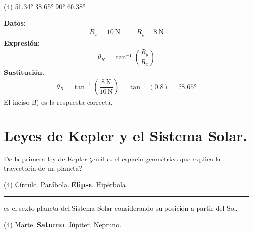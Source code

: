 \documentclass[12pt, letter]{exam}
\begin{document}
\begin{questions}
    \begin{tasks}(4)
        \task \ang{51.34}
        \task \ang{38.65}
        \task \ang{90}
        \task \ang{60.38}
    \end{tasks}
    \textbf{Datos:}
    \begin{align*}
    R_{x} = \SI{10}{\newton} \hspace{1cm} R_{y} = \SI{8}{\newton}
    \end{align*}
    \textbf{Expresión:}
    \begin{align*}
    \theta_{R} = \tan^{-1} \left( \dfrac{R_{y}}{R_{x}} \right)
    \end{align*}
    \textbf{Sustitución:}
    \begin{align*}
        \theta_{R} = \tan^{-1} \left( \dfrac{\SI{8}{\newton}}{\SI{10}{\newton}} \right) = \tan^{-1} (0.8) = \ang{38.65}
    \end{align*}
    El inciso B) es la respuesta correcta.

    \section{Leyes de Kepler y el Sistema Solar.}
    \question De la primera ley de Kepler ¿cuál es el espacio geométrico que explica la trayectoria de un planeta?
    \begin{tasks}(4)
        \task Círculo.
        \task Parábola.
        \task \underline{\textbf{Elipse}}.
        \task Hipérbola.
    \end{tasks}
    \question \rule{2cm}{0.1mm} es el sexto planeta del Sistema Solar considerando su posición a partir del Sol.
    \begin{tasks}(4)
        \task Marte.
        \task \underline{\textbf{Saturno}}.
        \task Júpiter.
        \task Neptuno.
    \end{tasks}
\end{questions}

\newpage
\end{document}
